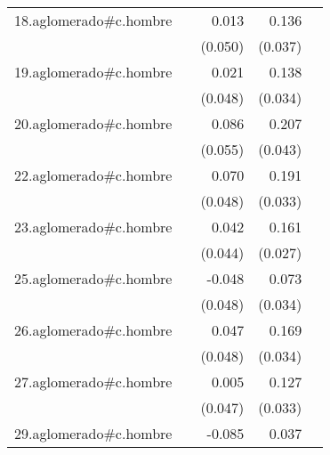 {\begin{longtable}{l*{4}{D{.}{.}{-1}}}
\addlinespace
18.aglomerado#c.hombre&                     &       0.013         &       0.136\sym{***}&                     \\
            &                     &     (0.050)         &     (0.037)         &                     \\
\addlinespace
19.aglomerado#c.hombre&                     &       0.021         &       0.138\sym{***}&                     \\
            &                     &     (0.048)         &     (0.034)         &                     \\
\addlinespace
20.aglomerado#c.hombre&                     &       0.086         &       0.207\sym{***}&                     \\
            &                     &     (0.055)         &     (0.043)         &                     \\
\addlinespace
22.aglomerado#c.hombre&                     &       0.070         &       0.191\sym{***}&                     \\
            &                     &     (0.048)         &     (0.033)         &                     \\
\addlinespace
23.aglomerado#c.hombre&                     &       0.042         &       0.161\sym{***}&                     \\
            &                     &     (0.044)         &     (0.027)         &                     \\
\addlinespace
25.aglomerado#c.hombre&                     &      -0.048         &       0.073\sym{*}  &                     \\
            &                     &     (0.048)         &     (0.034)         &                     \\
\addlinespace
26.aglomerado#c.hombre&                     &       0.047         &       0.169\sym{***}&                     \\
            &                     &     (0.048)         &     (0.034)         &                     \\
\addlinespace
27.aglomerado#c.hombre&                     &       0.005         &       0.127\sym{***}&                     \\
            &                     &     (0.047)         &     (0.033)         &                     \\
\addlinespace
29.aglomerado#c.hombre&                     &      -0.085         &       0.037         &                     \\

\end{longtable}}
